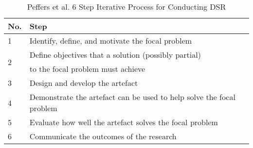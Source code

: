 \begin{table}[ht]
  \begin{center}
    \caption{Peffers et al. 6 Step Iterative Process for Conducting DSR}
    \label{tab:PefferGuidelines}
    \begin{tabular}{|l|l|} %
      \hline
      \textbf{No.}       & \textbf{Step}                                                        \\
      \hline
      1                  & Identify, define, and motivate the focal problem                     \\
      \hline
      \multirow{2}{*}{2} & Define objectives that a solution (possibly partial)                 \\
                         & to the focal problem must achieve                                    \\
      \hline
      3                  & Design and develop the artefact                                      \\
      \hline
      4                  & Demonstrate the artefact can be used to help solve the focal problem \\
      \hline
      5                  & Evaluate how well the artefact solves the focal problem              \\
      \hline
      6                  & Communicate the outcomes of the research                             \\
      \hline
    \end{tabular}
  \end{center}
\end{table}
